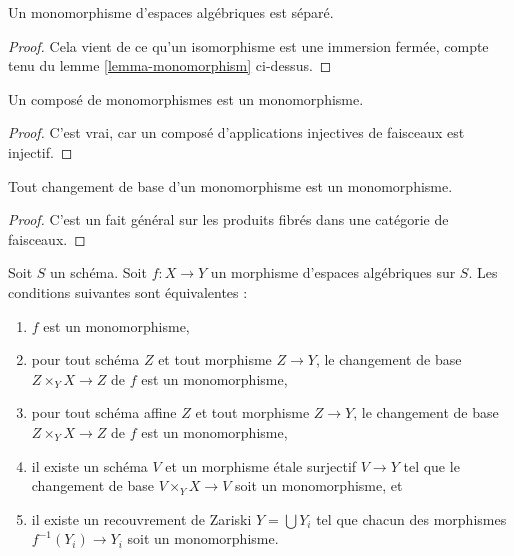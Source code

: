 \begin{lemma}
\label{lemma-monomorphism-separated}
Un monomorphisme d'espaces algébriques est séparé.
\end{lemma}

\begin{proof}
Cela vient de ce qu'un isomorphisme est une immersion fermée, compte tenu du
lemme \ref{lemma-monomorphism} ci-dessus.
\end{proof}

\begin{lemma}
\label{lemma-composition-monomorphism}
Un composé de monomorphismes est un monomorphisme.
\end{lemma}

\begin{proof}
C'est vrai, car un composé d'applications injectives de faisceaux est injectif.
\end{proof}

\begin{lemma}
\label{lemma-base-change-monomorphism}
Tout changement de base d'un monomorphisme est un monomorphisme.
\end{lemma}

\begin{proof}
C'est un fait général sur les produits fibrés dans une catégorie de faisceaux.
\end{proof}

\begin{lemma}
\label{lemma-monomorphism-local}
Soit $S$ un schéma.
Soit $f : X \to Y$ un morphisme d'espaces algébriques sur $S$.
Les conditions suivantes sont équivalentes :
\begin{enumerate}
\item $f$ est un monomorphisme,
\item pour tout schéma $Z$ et tout morphisme $Z \to Y$, le
changement de base $Z \times_Y X \to Z$ de $f$ est un monomorphisme,
\item pour tout schéma affine $Z$ et tout morphisme $Z \to Y$, le
changement de base $Z \times_Y X \to Z$ de $f$ est un monomorphisme,
\item il existe un schéma $V$ et un morphisme \'etale surjectif
$V \to Y$ tel que le changement de base $V \times_Y X \to V$ soit un
monomorphisme, et
\item il existe un recouvrement de Zariski $Y = \bigcup Y_i$ tel que chacun
des morphismes $f^{-1}(Y_i) \to Y_i$ soit un monomorphisme.
\end{enumerate}
\end{lemma}

